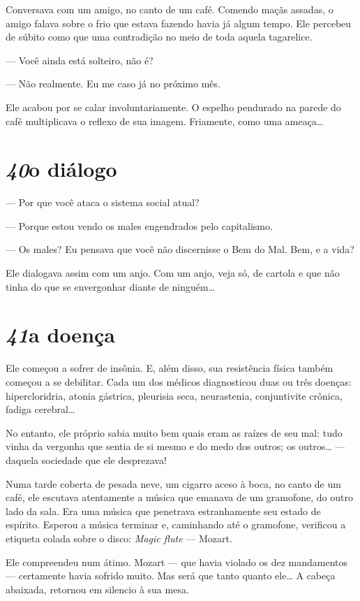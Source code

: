 Conversava com um amigo, no canto de um café. Comendo maçãs assadas, o
amigo falava sobre o frio que estava fazendo havia já algum tempo. Ele
percebeu de súbito como que uma contradição no meio de toda aquela
tagarelice.

--- Você ainda está solteiro, não é?

--- Não realmente. Eu me caso já no próximo mês.

Ele acabou por se calar involuntariamente. O espelho pendurado na parede
do café multiplicava o reflexo de sua imagem. Friamente, como uma
ameaça\ldots{}

\section*{\textit{40}\es o diálogo}

--- Por que você ataca o sistema social atual?

--- Porque estou vendo os males engendrados pelo capitalismo.

--- Os males? Eu pensava que você não discernisse o Bem do Mal. Bem, e a
vida?

Ele dialogava assim com um anjo. Com um anjo, veja só, de cartola e
que não tinha do que se envergonhar diante de ninguém\ldots{}

\section*{\textit{41}\es a doença}

Ele começou a sofrer de insônia. E, além disso, sua resistência física
também começou a se debilitar. Cada um dos médicos diagnosticou duas ou
três doenças: hipercloridria, atonia gástrica, pleurisia seca,
neurastenia, conjuntivite crônica, fadiga cerebral\ldots{}

No entanto, ele próprio sabia muito bem quais eram as raízes de seu mal:
tudo vinha da vergonha que sentia de si mesmo e do medo dos outros; os
outros\ldots{} --- daquela sociedade que ele desprezava!

Numa tarde coberta de pesada neve, um cigarro aceso à boca, no canto de
um café, ele escutava atentamente a música que emanava de um gramofone,
do outro lado da sala. Era uma música que penetrava estranhamente seu
estado de espírito. Esperou a música terminar e, caminhando até o
gramofone, verificou a etiqueta colada sobre o disco: \textit{Magic flute} --- Mozart.

Ele compreendeu num átimo. Mozart --- que havia violado os dez mandamentos
--- certamente havia sofrido muito. Mas será que tanto quanto ele\ldots{} A
cabeça abaixada, retornou em silencio à sua mesa.

